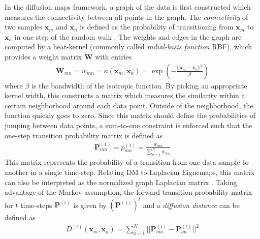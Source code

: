 In the diffusion maps framework, a graph of the data is first constructed which measures the connectivity between all points in the graph.  The \textit{connectivity} of two samples $\bm{x}_{m}$ and $\bm{x}_{n}$ is defined as the probability of transitioning from $\bm{x}_{m}$ to $\bm{x}_{n}$ in one step of the random walk \citep{Hajek2015RandomProcesses}.  The weights and edges in the graph are computed by a heat-kernel (commonly called \textit{radial-basis function} RBF), which provides a weight matrix $\bm{W}$ with entries
\begin{align}
	\bm{W}_{mn} = w_{mn} = \kappa(\bm{x}_{m},\bm{x}_{n}) = \exp \left( - \frac{|| \bm{x}_{m} - \bm{x}_{n} ||^{2}}{\beta} \right)
\end{align}
\noindent
where $\beta$ is the bandwidth of the isotropic function.  By picking an appropriate kernel width, this constructs a matrix which measures the similarity within a certain neighborhood around each data point.  Outside of the neighborhood, the function quickly goes to zero.  Since this matrix should define the probabilities of jumping between data points, a sum-to-one constraint is enforced such that the one-step transition probability matrix is defined as
\begin{align}
	\bm{P}_{mn}^{(1)} = p_{mn}^{(1)} = \frac{w_{mn}}{\sum_{o=1}^{N}w_{mo}}
\end{align}
\noindent
This matrix represents the probability of a transition from one data sample to another in a single time-step. Relating DM to Laplacian Eignemaps, this matrix can also be interpreted as the normalized graph Laplacian matrix \citep{Thorstensen2009ManifoldThesis}. Taking advantage of the Markov assumption, the forward transition probability matrix for $t$ time-steps $\bm{P}^{(t)}$ is given by $(\bm{P}^{(1)})^{t}$ \citep{Hajek2015RandomProcesses} and a \textit{diffusion distance} can be defined as
\begin{align} \label{eq:Diffusion_Distance}
	D^{(t)}(\bm{x}_{m}, \bm{x}_{n}) = \sum_{o=1}^{N} || \bm{P}_{mo}^{(t)} - \bm{P}_{on}^{(t)}||^{2}
\end{align}

